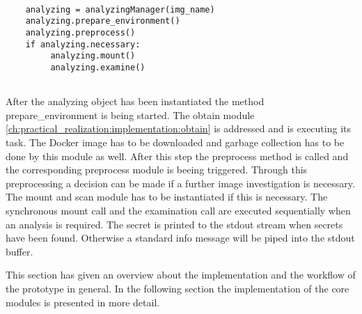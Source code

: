 \lstset{language=Python} 
\begin{lstlisting}[]
	
    analyzing = analyzingManager(img_name)
    analyzing.prepare_environment()
    analyzing.preprocess()
    if analyzing.necessary:
         analyzing.mount()
         analyzing.examine()
    
\end{lstlisting}
After the analyzing object has been instantiated the method prepare\_environment is being started. 
The obtain module \ref{ch:practical_realization:implementation:obtain} is addressed and is executing its task.
The Docker image has to be downloaded and garbage collection has to be done by this module as well. 
After this step the preprocess method is called and the corresponding preprocess module is beeing triggered.
Through this preprocessing a decision can be made if a further image investigation is necessary. 
The mount and scan module has to be instantiated if this is necessary.
The synchronous mount call and the examination call are executed sequentially when an analysis is required.
The secret is printed to the stdout stream when secrets have been found. 
Otherwise a standard info message will be piped into the stdout buffer.

This section has given an overview about the implementation and the workflow of the prototype in general.
In the following section the implementation of the core modules is presented in more detail.

